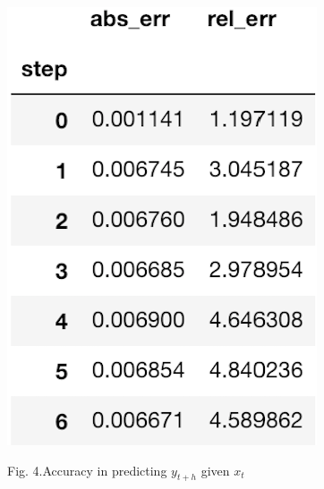 \documentclass{article}%
\begin{document}
\begin{figure}[h!]
  \centering
  \includegraphics[scale=0.55]{err_step.png}      
\begin{center}
\begin{small}
Fig. 4.Accuracy in predicting $y_{t+h}$ given $x_t$
\end{small}
\end{center}

  \label{err_step}
\end{figure}
\end{document}
